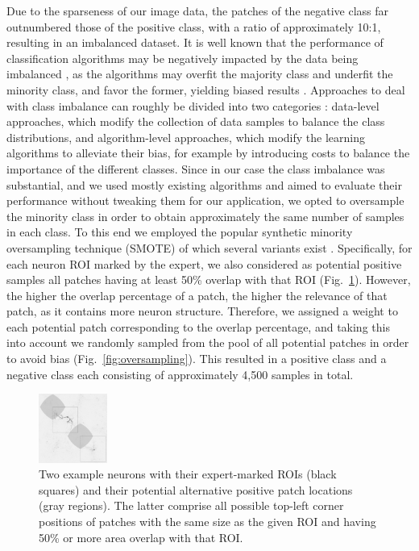 Due to the sparseness of our image data, the patches of the negative class far outnumbered those of the positive class, with a ratio of approximately 10:1, resulting in an imbalanced dataset. It is well known that the performance of classification algorithms may be negatively impacted by the data being imbalanced \cite{chawla2004editorial, daskalaki2006evaluation, forman2010apples, branco2016survey}, as the algorithms may overfit the majority class and underfit the minority class, and favor the former, yielding biased results \cite{garcia2014bias, li2018adaptive}. Approaches to deal with class imbalance can roughly be divided into two categories \cite{he2008learning, Krawczyk-2016, Haixiang-2017}: data-level approaches, which modify the collection of data samples to balance the class distributions, and algorithm-level approaches, which modify the learning algorithms to alleviate their bias, for example by introducing costs to balance the importance of the different classes. Since in our case the class imbalance was substantial, and we used mostly existing algorithms and aimed to evaluate their performance without tweaking them for our application, we opted to oversample the minority class in order to obtain approximately the same number of samples in each class. To this end we employed the popular synthetic minority oversampling technique (SMOTE) \cite{Chawla:2002:SSM:1622407.1622416} of which several variants exist \cite{Saez2015, Krawczyk-2016, Gosain2017}. Specifically, for each neuron ROI marked by the expert, we also considered as potential positive samples all patches having at least 50\% overlap with that ROI (Fig.~\ref{fig:neuronROI}). However, the higher the overlap percentage of a patch, the higher the relevance of that patch, as it contains more neuron structure. Therefore, we assigned a weight to each potential patch corresponding to the overlap percentage, and taking this into account we randomly sampled from the pool of all potential patches in order to avoid bias (Fig.~\ref{fig:oversampling}). This resulted in a positive class and a negative class each consisting of approximately 4,500 samples in total.

\begin{figure}
	\centering
	\includegraphics[width=0.2\textwidth]{fig02}
	\caption{Two example neurons with their expert-marked ROIs (black squares) and their potential alternative positive patch locations (gray regions). The latter comprise all possible top-left corner positions of patches with the same size as the given ROI and having 50\% or more area overlap with that ROI.}
	\label{fig:neuronROI}
\end{figure}

